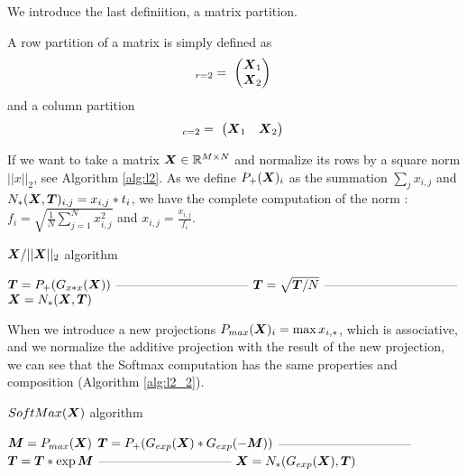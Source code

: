 \documentclass[acmsmall]{acmart}
\begin{document}
We introduce the last definiition, a matrix partition.
\begin{definition}
  A row partition of a matrix is simply defined as
  \begin{equation}
    [\Vc{X} ]_{r=2} = \
    \begin{pmatrix}
      \Vc{X}_1  \\
      \Vc{X}_2  \\
    \end{pmatrix}\\
  \end{equation}
  and a column partition
  \begin{equation}
    [\Vc{X} ]_{c=2} = \
    \begin{pmatrix}
      \Vc{X}_1  & \Vc{X}_2  \\
    \end{pmatrix}\\
  \end{equation}
\end{definition}
If we want to take a matrix ${\boldsymbol X} \in \mathbb{R}^{M\times N}$ and normalize
its rows by a square norm $||x||_2$, see Algorithm \ref{alg:l2}. As we
define $P_+({\boldsymbol X})_i$ as the summation $\sum_j x_{i,j}$ and
$N_*({\boldsymbol X}, {\boldsymbol T})_{i,j} = x_{i,j}*t_i$, we have the complete
computation of the norm : $f_i = \sqrt{\frac{1}{N}\sum_{j=1}^N
  x_{i,j}^2}$ and $x_{i,j} = \frac{x_{i,j}}{f_i}$.

\begin{algorithm}
    \caption{${\boldsymbol X}/||{\boldsymbol X}||_2$ algorithm}
    \label{alg:l2}
    \begin{algorithmic}
      \STATE ${\boldsymbol T} = P_+(G_{x*x}({\boldsymbol X}))$
      \STATE --------------------------------
      \STATE ${\boldsymbol T} = \sqrt{{\boldsymbol T}/N}$     
      \STATE --------------------------------
      \STATE ${\boldsymbol X} = N_*({\boldsymbol X},{\boldsymbol T})$  
    \end{algorithmic}
\end{algorithm}

When we introduce a new projections $P_{max}({\boldsymbol X})_i =
\max{x_{i,*}}$, which is associative, and we normalize the additive
projection with the result of the new projection, we can see that the
Softmax computation has the same properties and composition (Algorithm \ref{alg:l2_2}).

\begin{algorithm}
    \caption{$SoftMax({\boldsymbol X})$ algorithm}
    \label{alg:l2_2}
    \begin{algorithmic}
      \STATE ${\boldsymbol M} = P_{max}({\boldsymbol X})$
      \STATE ${\boldsymbol T} = P_+(G_{exp}({\boldsymbol X})*G_{exp}(-{\boldsymbol M}))$
      \STATE --------------------------------
      \STATE ${\boldsymbol T} = {\boldsymbol T}*\exp{{\boldsymbol M}}$    
      \STATE --------------------------------
      \STATE ${\boldsymbol X} = N_*(G_{exp}({\boldsymbol X}),{\boldsymbol T})$ 
    \end{algorithmic}
\end{algorithm}
\end{document}
